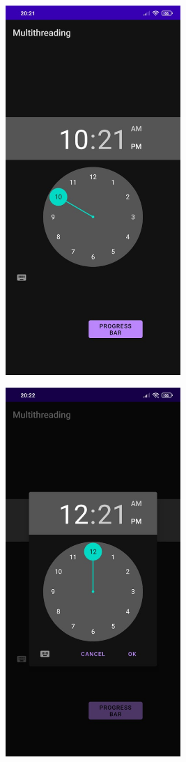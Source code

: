 \documentclass[12pt,letterpaper]{article}
\begin{document}
\subsection*{}
\begin{figure}[h]
    \centering
    \includegraphics[height=14cm, keepaspectratio]{Outputs/Alarm1.jpeg}
\end{figure}
\begin{figure}
    \centering
    \includegraphics[height=14cm, keepaspectratio]{Outputs/Alarm2.jpeg}
\end{figure}
\end{document}
